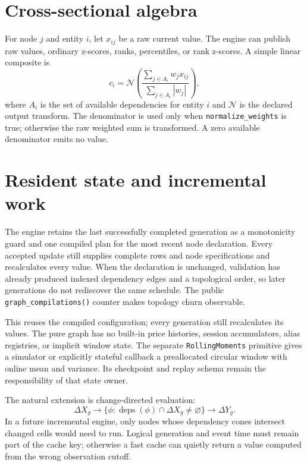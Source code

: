 \documentclass{strategynet-journal}
\begin{document}
\section{Cross-sectional algebra}

For node \(j\) and entity \(i\), let \(x_{ij}\) be a raw current value.
The engine can publish raw values, ordinary z-scores, ranks, percentiles, or
rank z-scores.  A simple linear composite is
\[
  c_i = \mathcal N\!\left(
    \frac{\sum_{j\in A_i}w_jx_{ij}}
         {\sum_{j\in A_i}|w_j|}
  \right),
\]
where \(A_i\) is the set of available dependencies for entity \(i\) and
\(\mathcal N\) is the declared output transform.  The denominator is used only
when \texttt{normalize\_weights} is true; otherwise the raw weighted sum is
transformed.  A zero available denominator emits no value.

\section{Resident state and incremental work}

The engine retains the last successfully completed generation as a
monotonicity guard and one compiled plan for the most recent node declaration.
Every accepted update still supplies complete rows and node specifications and
recalculates every value.  When the declaration is unchanged, validation has
already produced indexed dependency edges and a topological order, so later
generations do not rediscover the same schedule.  The public
\texttt{graph\_compilations()} counter makes topology churn observable.

This reuses the compiled configuration; every generation still recalculates
its values.  The pure graph has no built-in price histories, session accumulators, alias
registries, or implicit window state.  The separate \texttt{RollingMoments}
primitive gives a simulator or explicitly stateful callback a preallocated
circular window with online mean and variance.  Its checkpoint and replay
schema remain the responsibility of that state owner.

The natural extension is change-directed evaluation:
\[
  \Delta X_g \longrightarrow
  \{\phi:\operatorname{deps}(\phi)\cap\Delta X_g\ne\varnothing\}
  \longrightarrow \Delta Y_g.
\]
In a future incremental engine, only nodes whose dependency cones intersect
changed cells would need to run.
Logical generation and event time must remain part of the cache key; otherwise
a fast cache can quietly return a value computed from the wrong observation
cutoff.
\end{document}
